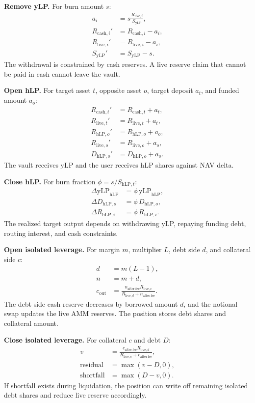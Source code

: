 \documentclass[11pt]{article}
\newcommand{\cash}{\mathrm{cash}}
\newcommand{\live}{\mathrm{live}}
\newcommand{\hlp}{\mathrm{hLP}}
\newcommand{\ylp}{\mathrm{yLP}}
\begin{document}
\textbf{Remove yLP.} For burn amount $s$:
\begin{align}
a_i &= s\frac{R_{\live,i}}{S_{\ylp}},\\
R_{\cash,i}' &= R_{\cash,i}-a_i,\\
R_{\live,i}' &= R_{\live,i}-a_i,\\
S_{\ylp}' &= S_{\ylp}-s.
\end{align}
The withdrawal is constrained by cash reserves. A live reserve claim that cannot be paid in cash cannot leave the vault.

\textbf{Open hLP.} For target asset $t$, opposite asset $o$, target deposit $a_t$, and funded amount $a_o$:
\begin{align}
R_{\cash,t}' &= R_{\cash,t}+a_t,\\
R_{\live,t}' &= R_{\live,t}+a_t,\\
R_{\hlp,o}' &= R_{\hlp,o}+a_o,\\
R_{\live,o}' &= R_{\live,o}+a_o,\\
D_{\hlp,o}' &= D_{\hlp,o}+a_o.
\end{align}
The vault receives yLP and the user receives hLP shares against NAV delta.

\textbf{Close hLP.} For burn fraction $\phi=s/S_{\hlp,t}$:
\begin{align}
\Delta \mathrm{yLP}_{\hlp} &= \phi\,\mathrm{yLP}_{\hlp},\\
\Delta D_{\hlp,o} &= \phi\,D_{\hlp,o},\\
\Delta R_{\hlp,i} &= \phi\,R_{\hlp,i}.
\end{align}
The realized target output depends on withdrawing yLP, repaying funding debt, routing interest, and cash constraints.

\textbf{Open isolated leverage.} For margin $m$, multiplier $L$, debt side $d$, and collateral side $c$:
\begin{align}
d &= m(L-1),\\
n &= m+d,\\
c_{\mathrm{out}} &= \frac{n_{\mathrm{after\ fee}}R_{\live,c}}{R_{\live,d}+n_{\mathrm{after\ fee}}}.
\end{align}
The debt side cash reserve decreases by borrowed amount $d$, and the notional swap updates the live AMM reserves. The position stores debt shares and collateral amount.

\textbf{Close isolated leverage.} For collateral $c$ and debt $D$:
\begin{align}
v &= \frac{c_{\mathrm{after\ fee}}R_{\live,d}}{R_{\live,c}+c_{\mathrm{after\ fee}}},\\
\mathrm{residual} &= \max(v-D,0),\\
\mathrm{shortfall} &= \max(D-v,0).
\end{align}
If shortfall exists during liquidation, the position can write off remaining isolated debt shares and reduce live reserve accordingly.
\end{document}

